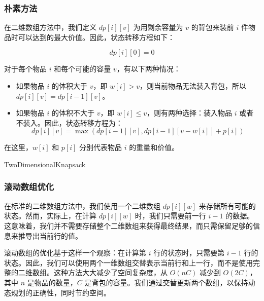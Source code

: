 \documentclass[UTF8,titlepage]{ctexart}
\numberwithin{figure}{section}
\begin{document}
\subsubsection{朴素方法}

在二维数组方法中，我们定义 $dp[i][v]$ 为用剩余容量为 $v$ 的背包来装前 $i$ 件物品时可以达到的最大价值。因此，状态转移方程如下：

\[ dp[i][0] = 0 \]

对于每个物品 $i$ 和每个可能的容量 $v$，有以下两种情况：

\begin{itemize}
  \item 如果物品 $i$ 的体积大于 $v$，即 $w[i] > v$，则当前物品无法装入背包，所以 $dp[i][v] = dp[i-1][v]$。
  \item 如果物品 $i$ 的体积不大于 $v$，即 $w[i] \leq v$，则有两种选择：装入物品 $i$ 或者不装入。因此，状态转移方程为：
  \[ dp[i][v] = \max(dp[i-1][v], dp[i-1][v-w[i]] + p[i]) \]
\end{itemize}

在这里，$w[i]$ 和 $p[i]$ 分别代表物品 $i$ 的重量和价值。

\begin{algorithm}[H]
\SetAlgoLined
\DontPrintSemicolon
{}
\caption{TwoDimensionalKnapsack}
\end{algorithm}

\subsubsection{滚动数组优化}
在标准的二维数组方法中，我们使用一个二维数组 $dp[i][w]$ 来存储所有可能的状态。然而，实际上，在计算 $dp[i][w]$ 时，我们只需要前一行 $i-1$ 的数据。这意味着，我们并不需要存储整个二维数组来获得最终结果，而只需保留足够的信息来推导出当前行的值。

滚动数组的优化基于这样一个观察：在计算第 $i$ 行的状态时，只需要第 $i-1$ 行的状态。因此，我们可以使用两个一维数组交替表示当前行和上一行，而不是使用完整的二维数组。这种方法大大减少了空间复杂度，从 \(O(nC)\) 减少到 \(O(2C)\)，其中 \(n\) 是物品的数量，\(C\) 是背包的容量。我们通过交替更新两个数组，以保持动态规划的正确性，同时节约空间。
\end{document}

